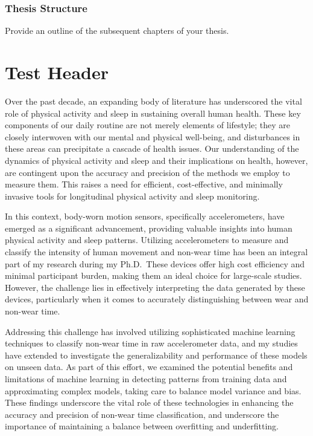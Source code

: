 \documentclass[
  8pt,
  letterpaper,
  DIV=11,
  numbers=noendperiod]{scrartcl}
\begin{document}
\hypertarget{thesis-structure}{%
\subsubsection{Thesis Structure}\label{thesis-structure}}

Provide an outline of the subsequent chapters of your thesis.

\hypertarget{test-header}{%
\section{Test Header}\label{test-header}}

Over the past decade, an expanding body of literature has underscored
the vital role of physical activity and sleep in sustaining overall
human health. These key components of our daily routine are not merely
elements of lifestyle; they are closely interwoven with our mental and
physical well-being, and disturbances in these areas can precipitate a
cascade of health issues. Our understanding of the dynamics of physical
activity and sleep and their implications on health, however, are
contingent upon the accuracy and precision of the methods we employ to
measure them. This raises a need for efficient, cost-effective, and
minimally invasive tools for longitudinal physical activity and sleep
monitoring.

In this context, body-worn motion sensors, specifically accelerometers,
have emerged as a significant advancement, providing valuable insights
into human physical activity and sleep patterns. Utilizing
accelerometers to measure and classify the intensity of human movement
and non-wear time has been an integral part of my research during my
Ph.D.~These devices offer high cost efficiency and minimal participant
burden, making them an ideal choice for large-scale studies. However,
the challenge lies in effectively interpreting the data generated by
these devices, particularly when it comes to accurately distinguishing
between wear and non-wear time.

Addressing this challenge has involved utilizing sophisticated machine
learning techniques to classify non-wear time in raw accelerometer data,
and my studies have extended to investigate the generalizability and
performance of these models on unseen data. As part of this effort, we
examined the potential benefits and limitations of machine learning in
detecting patterns from training data and approximating complex models,
taking care to balance model variance and bias. These findings
underscore the vital role of these technologies in enhancing the
accuracy and precision of non-wear time classification, and underscore
the importance of maintaining a balance between overfitting and
underfitting.
\end{document}
